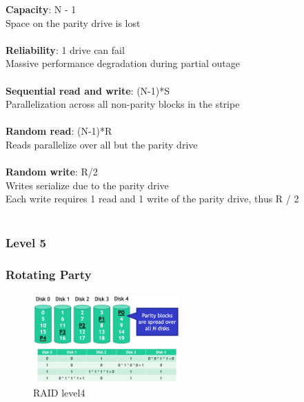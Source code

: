 \documentclass[10pt, oneside]{article}
\begin{document}
{\bf Capacity}: N - 1\\  Space on the parity drive is lost\\\\
{\bf Reliability}: 1 drive can fail\\  Massive performance degradation during partial outage\\\\
{\bf Sequential read and write}: (N-1)*S\\  Parallelization across all non-parity blocks in the stripe\\\\
{\bf Random read}: (N-1)*R\\  Reads parallelize over all but the parity drive\\\\
{\bf Random write}: R/2\\  Writes serialize due to the parity drive
\\ Each write requires 1 read and 1 write of the parity drive, thus R / 2\\\\

\subsubsection{Level 5}
\subsubsection*{Rotating Party}
\begin{figure}[H]
    \begin{center}
    \includegraphics[width=0.5\textwidth]{img/img78.png}
    \caption{RAID level4}
    \end{center}
\end{figure}
\end{document}
